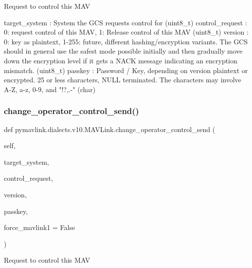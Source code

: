 \begin{DoxyVerb}
\begin{DoxyVerb}
\begin{DoxyVerb}Request to control this MAV

target_system             : System the GCS requests control for (uint8_t)
control_request           : 0: request control of this MAV, 1: Release control of this MAV (uint8_t)
version                   : 0: key as plaintext, 1-255: future, different hashing/encryption variants. The GCS should in general use the safest mode possible initially and then gradually move down the encryption level if it gets a NACK message indicating an encryption mismatch. (uint8_t)
passkey                   : Password / Key, depending on version plaintext or encrypted. 25 or less characters, NULL terminated. The characters may involve A-Z, a-z, 0-9, and "!?,.-" (char)\end{DoxyVerb}
 \mbox{\label{classpymavlink_1_1dialects_1_1v10_1_1MAVLink_ab004eca22848e70c1ae6efcb573f31ce}} 
\subsubsection{\texorpdfstring{change\+\_\+operator\+\_\+control\+\_\+send()}{change\_operator\_control\_send()}}
{\footnotesize\ttfamily def pymavlink.\+dialects.\+v10.\+M\+A\+V\+Link.\+change\+\_\+operator\+\_\+control\+\_\+send (\begin{DoxyParamCaption}\item[{}]{self,  }\item[{}]{target\+\_\+system,  }\item[{}]{control\+\_\+request,  }\item[{}]{version,  }\item[{}]{passkey,  }\item[{}]{force\+\_\+mavlink1 = {\ttfamily False} }\end{DoxyParamCaption})}

\begin{DoxyVerb}Request to control this MAV


\end{DoxyVerb}
\end{DoxyVerb}
\end{DoxyVerb}
